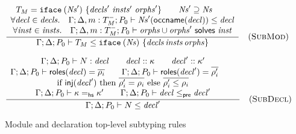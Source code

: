 \begin{figure}


\[
\frac{
\begin{array}{c}
T_M = \texttt{iface}\:(\mathit{Ns}')~\{\mathit{decls}'~\mathit{insts}'~\mathit{orphs}'\} \qquad
\mathit{Ns}' \supseteq \mathit{Ns} \qquad \\
\forall \mathit{decl} \in \mathit{decls}.\quad \Gamma; \Delta, m : T_M^-; P_0 \vdash \mathit{Ns}'(\textsf{occname}(\mathit{decl})) \le \mathit{decl} \\
\forall \mathit{inst} \in \mathit{insts}.\quad \Gamma; \Delta, m : T_M^-; P_0 \vdash \mathit{orphs} \cup \mathit{orphs}' ~\textsf{solves}~ \mathit{inst}
\end{array}
}{
\Gamma; \Delta; P_0 \vdash T_M \le \texttt{iface}\:(\mathit{Ns})~\{\mathit{decls}\, \mathit{insts}\, \mathit{orphs}\}
}
\quad(\textsc{SubMod})
\]


\[
\frac{
\begin{array}{c}
\Gamma; \Delta; P_0 \vdash N : \mathit{decl} \qquad
\mathit{decl} :: \kappa \qquad
\mathit{decl}' :: \kappa' \\
\Gamma; \Delta; P_0 \vdash \textsf{roles}(\mathit{decl}) = \overline{\rho_i} \qquad
\Gamma; \Delta; P_0 \vdash \textsf{roles}(\mathit{decl}') = \overline{\rho'_i} \qquad
\\
\textrm{if}~\textsf{inj}(\mathit{decl}')
    ~\textrm{then}~ \overline{\rho'_i = \rho_i}
    ~\textrm{else}~ \overline{\rho'_i \le \rho_i} \\
\Gamma; \Delta; P_0 \vdash \kappa =_\mathsf{hs} \kappa' \qquad
\Gamma; \Delta; P_0 \vdash \mathit{decl} \le_\textsf{pre} \mathit{decl}'
\end{array}
}{
\Gamma; \Delta; P_0 \vdash N \le \mathit{decl}'
}
\quad(\textsc{SubDecl})
\]

\caption{Module and declaration top-level subtyping rules}
\label{typing:top-subtyping}

\end{figure}

